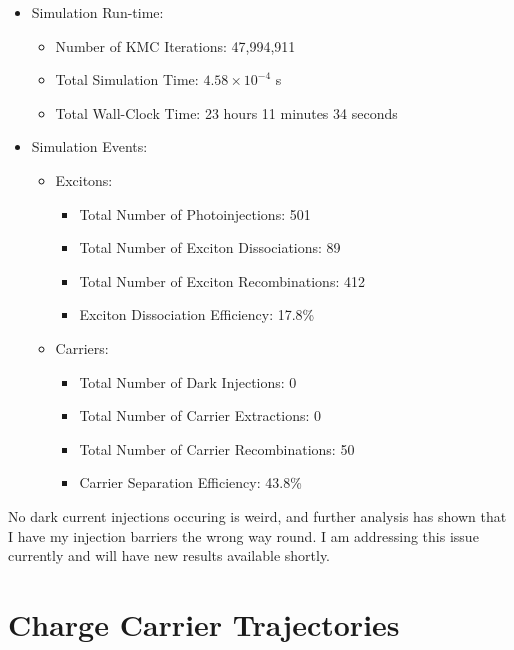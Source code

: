 \documentclass[12pt]{article}
\begin{document}
\begin{itemize}
    \item{Simulation Run-time:
            \begin{itemize}
                \item{Number of KMC Iterations: 47,994,911}
                \item{Total Simulation Time: $4.58 \times 10^{-4}$ s}
                \item{Total Wall-Clock Time: 23 hours 11 minutes 34 seconds}
            \end{itemize}
        }
    \item{Simulation Events:
            \begin{itemize}
                \item{Excitons:
                        \begin{itemize}
                            \item{Total Number of Photoinjections: 501}
                            \item{Total Number of Exciton Dissociations: 89}
                            \item{Total Number of Exciton Recombinations: 412}
                            \item{Exciton Dissociation Efficiency: 17.8\%}
                        \end{itemize}
                    }
                \item{Carriers:
                        \begin{itemize}
                            \item{Total Number of Dark Injections: 0}
                            \item{Total Number of Carrier Extractions: 0}
                            \item{Total Number of Carrier Recombinations: 50}
                            \item{Carrier Separation Efficiency: 43.8\%}
                        \end{itemize}
                    }
            \end{itemize}
        }
\end{itemize}

No dark current injections occuring is weird, and further analysis has shown that I have my injection barriers the wrong way round.
I am addressing this issue currently and will have new results available shortly.

\clearpage
\section{Charge Carrier Trajectories}
\end{document}
